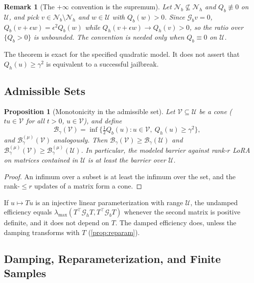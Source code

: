 \documentclass[11pt]{article}
\newtheorem{proposition}{Proposition}
\newtheorem{remark}{Remark}
\newcommand{\Gh}{\mathcal{G}_{h}}
\newcommand{\Gb}{\mathcal{G}_{b}}
\newcommand{\Barrier}{\mathcal{B}}
\newcommand{\U}{\mathcal{U}}
\newcommand{\Nb}{\mathcal{N}_{b}}
\newcommand{\Nh}{\mathcal{N}_{h}}
\begin{document}
\begin{remark}[The $+\infty$ convention is the supremum]
Let $\Nb\not\subseteq\Nh$ and $Q_b\not\equiv0$ on $\U$, and pick $v\in\Nb\setminus\Nh$ and $w\in\U$ with $Q_b(w)>0$. Since $\Gb v=0$, $Q_b(v+\epsilon w)=\epsilon^2Q_b(w)$ while $Q_h(v+\epsilon w)\to Q_h(v)>0$, so the ratio over $\{Q_b>0\}$ is unbounded. The convention is needed only when $Q_b\equiv0$ on $\U$.
\end{remark}

The theorem is exact for the specified quadratic model. It does not assert that $Q_h(u)\ge\gamma^2$ is equivalent to a successful jailbreak.

\subsection{Admissible Sets}
\label{app:admissible}

\begin{proposition}[Monotonicity in the admissible set]
\label{prop:monotone}
Let $\mathcal V\subseteq\U$ be a cone ($tu\in\mathcal V$ for all $t>0$, $u\in\mathcal V$), and define
\begin{equation*}
\Barrier_\gamma(\mathcal V)=\inf\bigl\{\tfrac12Q_b(u):u\in\mathcal V,\ Q_h(u)\ge\gamma^2\bigr\},
\end{equation*}
and $\Barrier^{(\mu)}_\gamma(\mathcal V)$ analogously. Then $\Barrier_\gamma(\mathcal V)\ge\Barrier_\gamma(\U)$ and $\Barrier^{(\mu)}_\gamma(\mathcal V)\ge\Barrier^{(\mu)}_\gamma(\U)$. In particular, the modeled barrier against rank-$r$ LoRA on matrices contained in $\U$ is at least the barrier over $\U$.
\end{proposition}
\begin{proof}
An infimum over a subset is at least the infimum over the set, and the rank-$\le r$ updates of a matrix form a cone.
\end{proof}

If $u\mapsto Tu$ is an injective linear parameterization with range $\U$, the undamped efficiency equals $\lambda_{\max}(T^\top\Gh T,T^\top\Gb T)$ whenever the second matrix is positive definite, and it does not depend on $T$. The damped efficiency does, unless the damping transforms with $T$ (\cref{prop:reparam}).

\subsection{Damping, Reparameterization, and Finite Samples}
\label{app:damping}
\end{document}
